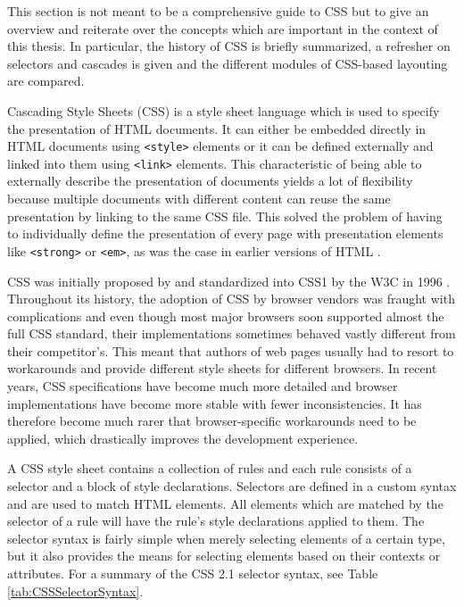 This section is not meant to be a comprehensive guide to CSS but to give an overview and reiterate over the concepts which are important in the context of this thesis.
In particular, the history of CSS is briefly summarized, a refresher on selectors and cascades is given and the different modules of CSS-based layouting are compared.

Cascading Style Sheets (CSS) is a style sheet language which is used to specify the presentation of HTML documents. 
It can either be embedded directly in HTML documents using \lstinline{<style>} elements or it can be defined externally and linked into them using \lstinline{<link>} elements. 
This characteristic of being able to externally describe the presentation of documents yields a lot of flexibility because multiple documents with different content can reuse the same presentation by linking to the same CSS file. 
This solved the problem of having to individually define the presentation of every page with presentation elements like \lstinline{<strong>} or \lstinline{<em>}, as was the case in earlier versions of HTML \parencite{HTML32}.

CSS was initially proposed by \cite{CSSProposal} and standardized into CSS1 by the W3C in 1996 \parencite{CSS1}. 
Throughout its history, the adoption of CSS by browser vendors was fraught with complications and even though most major browsers soon supported almost the full CSS standard, their implementations sometimes behaved vastly different from their competitor's. 
This meant that authors of web pages usually had to resort to workarounds and provide different style sheets for different browsers. 
In recent years, CSS specifications have become much more detailed \parencite{CSS21} and browser implementations have become more stable with fewer inconsistencies. 
It has therefore become much rarer that browser-specific workarounds need to be applied, which
drastically improves the development experience.

A CSS style sheet contains a collection of rules and each rule consists of a selector and a block of style declarations. 
Selectors are defined in a custom syntax and are used to match HTML elements. 
All elements which are matched by the selector of a rule will have the rule's style declarations applied to them. 
The selector syntax is fairly simple when merely selecting elements of a certain type, but it also provides the means for selecting elements based on their contexts or attributes. 
For a summary of the CSS 2.1 selector syntax, see Table \ref{tab:CSSSelectorSyntax}.

